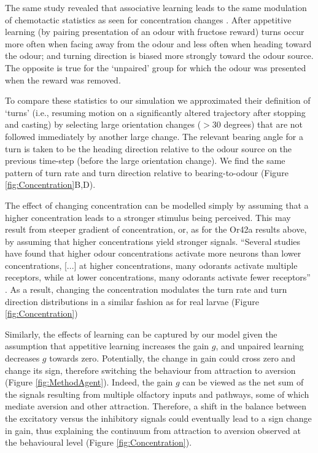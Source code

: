 \documentclass[11pt,a4paper]{article}
\begin{document}
The same study \citep{schleyer2015learning} revealed that associative learning leads to the same modulation of chemotactic statistics as seen for concentration changes \citep[][Figures 3 and 4]{schleyer2015learning}. After appetitive learning (by pairing presentation of an odour with fructose reward) turns occur more often when facing away from the odour and less often when heading toward the odour; and turning direction is biased more strongly toward the odour source. The opposite is true for the ‘unpaired’ group for which the odour was presented when the reward was removed. 


 To compare these statistics to our simulation we approximated their definition of ‘turns’ (i.e., resuming motion on a significantly altered trajectory after stopping and casting) by selecting large orientation changes ($>30$ degrees) that are not followed immediately by another large change. The relevant bearing angle for a turn is taken to be the heading direction relative to the odour source on the previous time-step (before the large orientation change). We find the same pattern of turn rate and turn direction relative to bearing-to-odour (Figure \ref{fig:Concentration}B,D).

The effect of changing concentration can be modelled simply by assuming that a higher concentration leads to a stronger stimulus being perceived.
 This may result from steeper gradient of concentration, or, as for the Or42a results above, by assuming that higher concentrations yield stronger signals.
   “Several studies have found that higher odour concentrations activate more neurons than lower concentrations, [...] at higher concentrations, many odorants activate multiple receptors, while at lower concentrations, many odorants activate fewer receptors” \citep{hallem2006coding}.
 As a result, changing the concentration modulates the turn rate and turn direction distributions in a similar fashion as for real larvae (Figure \ref{fig:Concentration})

Similarly, the effects of learning can be captured by our model given the assumption that appetitive learning increases the gain $g$, 
and unpaired learning decreases $g$ towards zero.
 Potentially, the change in gain could cross zero and change its sign, therefore switching the behaviour from attraction to aversion (Figure \ref{fig:MethodAgent}). 
Indeed, the gain $g$ can be viewed as the net sum of the signals resulting from multiple olfactory inputs and pathways, some of which mediate aversion and other attraction. Therefore, a shift in the balance between the excitatory versus the inhibitory signals could eventually lead to a sign change in gain, thus explaining the continuum from attraction to aversion observed at the behavioural level (Figure \ref{fig:Concentration}). 
\end{document}
